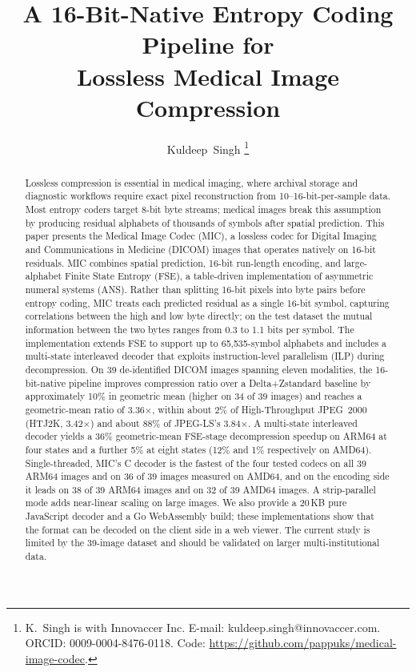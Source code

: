 \documentclass[journal]{IEEEtran}
\title{A 16-Bit-Native Entropy Coding Pipeline for\\
       Lossless Medical Image Compression}
\author{Kuldeep~Singh%
\thanks{K.\ Singh is with Innovaccer Inc.
E-mail: kuldeep.singh@innovaccer.com.
ORCID: 0009-0004-8476-0118.
Code: \url{https://github.com/pappuks/medical-image-codec}.}%
}
\begin{document}
\maketitle

\begin{abstract}
Lossless compression is essential in medical imaging, where archival storage
and diagnostic workflows require exact pixel reconstruction from
10--16-bit-per-sample data. Most entropy coders target 8-bit byte streams;
medical images break this assumption by producing residual alphabets of
thousands of symbols after spatial prediction. This paper presents the
Medical Image Codec (MIC), a lossless codec for Digital Imaging and
Communications in Medicine (DICOM) images that operates natively on 16-bit
residuals. MIC combines spatial prediction, 16-bit run-length encoding,
and large-alphabet Finite State Entropy (FSE), a table-driven implementation
of asymmetric numeral systems (ANS). Rather than splitting 16-bit pixels
into byte pairs before entropy coding, MIC treats each predicted residual
as a single 16-bit symbol, capturing correlations between the high and low
byte directly; on the test dataset the mutual information between the two
bytes ranges from 0.3 to 1.1 bits per symbol. The implementation extends
FSE to support up to 65,535-symbol alphabets and includes a multi-state
interleaved decoder that exploits instruction-level parallelism (ILP)
during decompression. On 39 de-identified DICOM images spanning eleven
modalities, the 16-bit-native pipeline improves compression ratio over a
Delta+Zstandard baseline by approximately 10\% in geometric mean (higher
on 34 of 39 images) and reaches a geometric-mean ratio of 3.36$\times$,
within about 2\% of High-Throughput JPEG~2000 (HTJ2K, 3.42$\times$) and
about 88\% of JPEG-LS's 3.84$\times$. A multi-state interleaved decoder
yields a 36\% geometric-mean FSE-stage decompression speedup on ARM64 at
four states and a further 5\% at eight states (12\% and 1\% respectively
on AMD64). Single-threaded, MIC's C decoder is the fastest of the four
tested codecs on all 39 ARM64 images and on 36 of 39 images measured on
AMD64, and on the encoding side it leads on 38 of 39 ARM64 images and on
32 of 39 AMD64 images. A strip-parallel mode adds near-linear scaling on
large images. We also provide a 20\,KB pure JavaScript decoder and a Go
WebAssembly build; these implementations show that the format can be
decoded on the client side in a web viewer. The current study is limited
by the 39-image dataset and should be validated on larger
multi-institutional data.
\end{abstract}
\end{document}
